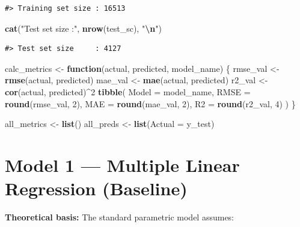 \documentclass[
]{article}
\newenvironment{Shaded}{\begin{snugshade}}{\end{snugshade}}
\newcommand{\AttributeTok}[1]{\textcolor[rgb]{0.13,0.29,0.53}{#1}}
\newcommand{\ControlFlowTok}[1]{\textcolor[rgb]{0.13,0.29,0.53}{\textbf{#1}}}
\newcommand{\DecValTok}[1]{\textcolor[rgb]{0.00,0.00,0.81}{#1}}
\newcommand{\FunctionTok}[1]{\textcolor[rgb]{0.13,0.29,0.53}{\textbf{#1}}}
\newcommand{\NormalTok}[1]{#1}
\newcommand{\OtherTok}[1]{\textcolor[rgb]{0.56,0.35,0.01}{#1}}
\newcommand{\SpecialCharTok}[1]{\textcolor[rgb]{0.81,0.36,0.00}{\textbf{#1}}}
\newcommand{\StringTok}[1]{\textcolor[rgb]{0.31,0.60,0.02}{#1}}
\begin{document}
\begin{verbatim}
#> Training set size : 16513
\end{verbatim}

\begin{Shaded}
\begin{Highlighting}[]
\FunctionTok{cat}\NormalTok{(}\StringTok{"Test set size     :"}\NormalTok{, }\FunctionTok{nrow}\NormalTok{(test\_sc),  }\StringTok{"}\SpecialCharTok{\textbackslash{}n}\StringTok{"}\NormalTok{)}
\end{Highlighting}
\end{Shaded}

\begin{verbatim}
#> Test set size     : 4127
\end{verbatim}

\begin{Shaded}
\begin{Highlighting}[]
\NormalTok{calc\_metrics }\OtherTok{\textless{}{-}} \ControlFlowTok{function}\NormalTok{(actual, predicted, model\_name) \{}
\NormalTok{  rmse\_val }\OtherTok{\textless{}{-}} \FunctionTok{rmse}\NormalTok{(actual, predicted)}
\NormalTok{  mae\_val  }\OtherTok{\textless{}{-}} \FunctionTok{mae}\NormalTok{(actual, predicted)}
\NormalTok{  r2\_val   }\OtherTok{\textless{}{-}} \FunctionTok{cor}\NormalTok{(actual, predicted)}\SpecialCharTok{\^{}}\DecValTok{2}
  \FunctionTok{tibble}\NormalTok{(}
    \AttributeTok{Model =}\NormalTok{ model\_name,}
    \AttributeTok{RMSE  =} \FunctionTok{round}\NormalTok{(rmse\_val, }\DecValTok{2}\NormalTok{),}
    \AttributeTok{MAE   =} \FunctionTok{round}\NormalTok{(mae\_val,  }\DecValTok{2}\NormalTok{),}
    \AttributeTok{R2    =} \FunctionTok{round}\NormalTok{(r2\_val,   }\DecValTok{4}\NormalTok{)}
\NormalTok{  )}
\NormalTok{\}}

\NormalTok{all\_metrics }\OtherTok{\textless{}{-}} \FunctionTok{list}\NormalTok{()}
\NormalTok{all\_preds   }\OtherTok{\textless{}{-}} \FunctionTok{list}\NormalTok{(}\AttributeTok{Actual =}\NormalTok{ y\_test)}
\end{Highlighting}
\end{Shaded}

\section{Model 1 --- Multiple Linear Regression
(Baseline)}\label{model-1-multiple-linear-regression-baseline}

\textbf{Theoretical basis:} The standard parametric model assumes:
\end{document}
